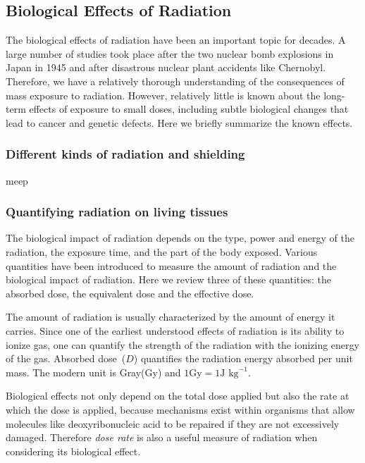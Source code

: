 \documentclass[nofootinbib,preprint,aip,pra]{revtex4-1}
\begin{document}
    \subsection{Biological Effects of Radiation}
        The biological effects of radiation have been an important topic for decades. A large
        number of studies took place after the two nuclear bomb explosions in Japan in 1945
        and after disastrous nuclear plant accidents like Chernobyl. Therefore, we have a relatively
        thorough understanding of the consequences of mass exposure to radiation. However, relatively
        little is known about the long-term effects of exposure to small doses, including subtle biological
        changes that lead to cancer and genetic defects. Here we briefly summarize the known effects.
        \subsubsection{Different kinds of radiation and shielding}
        meep
        \subsubsection{Quantifying radiation on living tissues}
        The biological impact of radiation depends on the type, power and energy of the radiation, the
        exposure time, and the part of the body exposed. Various quantities have been introduced to
        measure the amount of radiation and the biological impact of radiation. Here we review three
        of these quantities: the absorbed dose, the equivalent dose and the effective dose.

        The amount of radiation is usually characterized by the amount of energy it carries. Since one of
        the earliest understood effects of radiation is its ability to ionize gas, one can quantify the
        strength of the radiation with the ionizing energy of the gas.
        Absorbed dose~($D$) quantifies the 
        radiation energy absorbed per unit mass. The modern unit is Gray(Gy)
        and $1\text{Gy}=1\text{J kg}^{-1}$.\cite{u16}

        Biological effects not only depend on the total dose applied but also the rate at which the 
        dose is applied, because mechanisms exist within organisms that allow molecules like deoxyribonucleic acid
        to be repaired if they are not excessively damaged. Therefore {\it dose rate} is also a useful
        measure of radiation when considering its biological effect.
\end{document}
